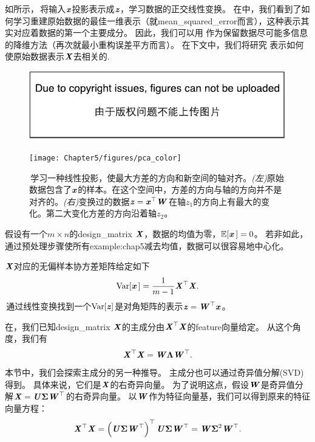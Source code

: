 
如所示，\,将输入$\Vx$投影表示成$\Vz$，学习数据的正交线性变换。
在中，我们看到了如何学习重建原始数据的最佳一维表示（就\gls{mean_squared_error}而言），这种表示其实对应着数据的第一个主要成分。
因此，我们可以用\,\,作为保留数据尽可能多信息的降维方法（再次就最小重构误差平方而言）。
在下文中，我们将研究\,\,表示如何使原始数据表示$\MX$去相关的.

\begin{figure}[!htb]
\ifOpenSource
\centerline{\includegraphics{figure.pdf}}
\else
\centerline{\texttt{[image: Chapter5/figures/pca\_color]}}
\fi
\caption{\,学习一种线性投影，使最大方差的方向和新空间的轴对齐。\emph{(左)}原始数据包含了$\Vx$的样本。在这个空间中，方差的方向与轴的方向并不是对齐的。\emph{(右)}变换过的数据$\Vz = \Vx^{\top}\MW$在轴$z_1$的方向上有最大的变化。第二大变化方差的方向沿着轴$z_2$。}
\label{fig:chap5_pca}
\end{figure}

假设有一个$m\times n$的\gls{design_matrix} $\MX$，数据的均值为零，$\SetE[\Vx\,] = 0$。
若非如此，通过预处理步骤使所有\gls{example:chap5}减去均值，数据可以很容易地中心化。

$\MX$对应的无偏样本协方差矩阵给定如下
\begin{equation}
    \text{Var}[\Vx\,] = \frac{1}{m-1} \MX^\Tsp \MX .
\end{equation}
\,通过线性变换找到一个$\text{Var}[\Vz]$是对角矩阵的表示$\Vz=\MW^\Tsp\Vx$。

在，我们已知\gls{design_matrix} $\MX$的主成分由$\MX^\Tsp\MX$的\gls{feature}向量给定。
从这个角度，我们有
\begin{equation}
    \MX^\Tsp\MX = \MW \VLambda \MW^\Tsp .
\end{equation}
本节中，我们会探索主成分的另一种推导。
主成分也可以通过奇异值分解(SVD)得到。
具体来说，它们是$\MX$的右奇异向量。
为了说明这点，假设$\MW$是奇异值分解$\MX = \MU\VSigma\MW^\Tsp$的右奇异向量。
以$\MW$作为特征向量基，我们可以得到原来的特征向量方程：
\begin{equation}
    \MX^\Tsp\MX = \left( \MU\VSigma \MW^\Tsp \right)^\Tsp \MU\VSigma \MW^\Tsp = 
    \MW \VSigma^2 \MW^\Tsp .
\end{equation}

